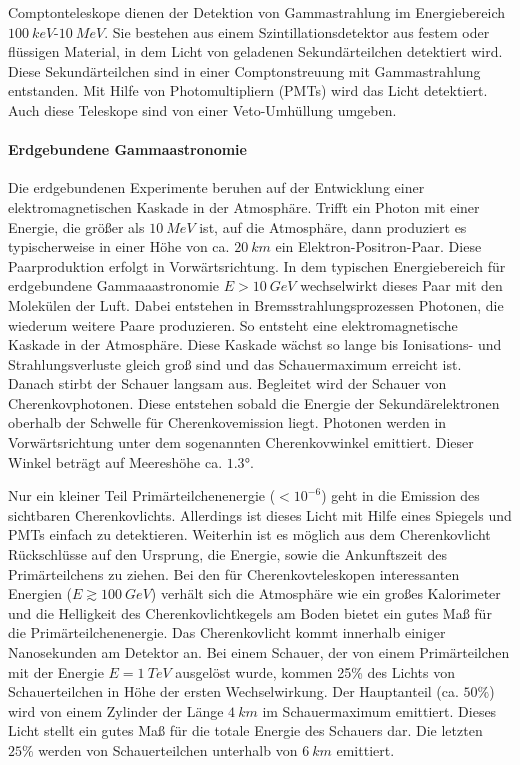 Comptonteleskope dienen der Detektion von Gammastrahlung im Energiebereich $\SI{100}{keV}$-$\SI{10}{MeV}$.
Sie bestehen aus einem Szintillationsdetektor aus festem oder flüssigen Material, in dem Licht von geladenen Sekundärteilchen detektiert wird.
Diese Sekundärteilchen sind in einer Comptonstreuung mit Gammastrahlung entstanden.
Mit Hilfe von Photomultipliern (PMTs) wird das Licht detektiert.
Auch diese Teleskope sind von einer Veto-Umhüllung umgeben.\cite{Weekes}

\paragraph{Erdgebundene Gammaastronomie}
Die erdgebundenen Experimente beruhen auf der Entwicklung einer elektromagnetischen Kaskade in der Atmosphäre.
Trifft ein Photon mit einer Energie, die größer als $\SI{10}{MeV}$ ist, auf die Atmosphäre, dann produziert es typischerweise in einer Höhe von ca. $\SI{20}{km}$ ein Elektron-Positron-Paar.
Diese Paarproduktion erfolgt in Vorwärtsrichtung.
In dem typischen Energiebereich für erdgebundene Gammaaastronomie $E>\SI{10}{GeV}$ wechselwirkt dieses Paar mit den Molekülen der Luft.
Dabei entstehen in Bremsstrahlungsprozessen Photonen, die wiederum weitere Paare produzieren.
So entsteht eine elektromagnetische Kaskade in der Atmosphäre.
Diese Kaskade wächst so lange bis Ionisations- und Strahlungsverluste gleich groß sind und das Schauermaximum erreicht ist.
Danach stirbt der Schauer langsam aus.
Begleitet wird der Schauer von Cherenkovphotonen.
Diese entstehen sobald die Energie der Sekundärelektronen oberhalb der Schwelle für Cherenkovemission liegt.
Photonen werden in Vorwärtsrichtung unter dem sogenannten Cherenkovwinkel emittiert. 
Dieser Winkel beträgt auf Meereshöhe ca. $1.3°$.\cite{Weekes}

Nur ein kleiner Teil Primärteilchenenergie ($<10^{-6}$) geht in die Emission des sichtbaren Cherenkovlichts.
Allerdings ist dieses Licht mit Hilfe eines Spiegels und PMTs einfach zu detektieren.
Weiterhin ist es möglich aus dem Cherenkovlicht Rückschlüsse auf den Ursprung, die Energie, sowie die Ankunftszeit des Primärteilchens zu ziehen.
Bei den für Cherenkovteleskopen interessanten Energien ($E\gtrsim \SI{100}{GeV}$) verhält sich die Atmosphäre wie ein großes Kalorimeter und die Helligkeit des Cherenkovlichtkegels am Boden bietet ein gutes Maß für die Primärteilchenenergie.
Das Cherenkovlicht kommt innerhalb einiger Nanosekunden am Detektor an.
Bei einem Schauer, der von einem Primärteilchen mit der Energie $E=\SI{1}{TeV}$ ausgelöst wurde, kommen 25\% des Lichts von Schauerteilchen in Höhe der ersten Wechselwirkung.
Der Hauptanteil (ca. $50\%$) wird von einem Zylinder der Länge $\SI{4}{km}$ im Schauermaximum emittiert.
Dieses Licht stellt ein gutes Maß für die totale Energie des Schauers dar.
Die letzten $25\%$ werden von Schauerteilchen unterhalb von $\SI{6}{km}$ emittiert.\cite{Weeks}

